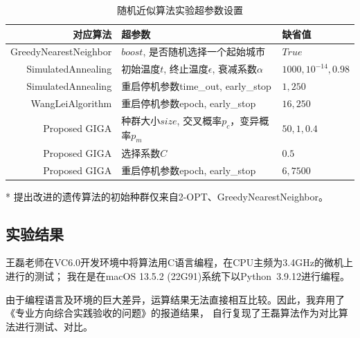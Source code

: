 \documentclass[12pt]{ctexart}
\begin{document}
\begin{table}[htbp]
    \caption{随机近似算法实验超参数设置}
    \centering

    \begin{threeparttable}
        \begin{tabular}{rll}
            \toprule
            对应算法                  & 超参数                                   & 缺省值                    \\
            \midrule
            GreedyNearestNeighbor & $boost$, 是否随机选择一个起始城市                 & $True$                 \\
            SimulatedAnnealing    & 初始温度$t$, 终止温度$\epsilon$, 衰减系数$\alpha$ & $1000, 10^{-14}, 0.98$ \\
            SimulatedAnnealing    & 重启停机参数time\_out, early\_stop          & $1, 250$               \\
            WangLeiAlgorithm      & 重启停机参数epoch, early\_stop              & $16, 250$              \\
            Proposed GIGA         & 种群大小$size$, 交叉概率$p_c$，变异概率$p_m$       & $50, 1, 0.4$           \\
            Proposed GIGA         & 选择系数$C$                               & $0.5$                  \\
            Proposed GIGA         & 重启停机参数epoch, early\_stop              & $6, 7500$              \\
            \bottomrule
        \end{tabular}
        \begin{tablenotes}
            \item [*]   提出改进的遗传算法的初始种群仅来自2-OPT、GreedyNearestNeighbor。
        \end{tablenotes}
    \end{threeparttable}
    \qquad
\end{table}

\subsection{实验结果}
王磊老师在VC6.0开发环境中将算法用C语言编程，在CPU主频为3.4GHz的微机上进行的测试；
我在是在macOS 13.5.2 (22G91)系统下以Python~3.9.12进行编程。

由于编程语言及环境的巨大差异，运算结果无法直接相互比较。因此，我弃用了《专业方向综合实践验收的问题》的报道结果，
自行复现了王磊算法作为对比算法进行测试、对比。
\end{document}
